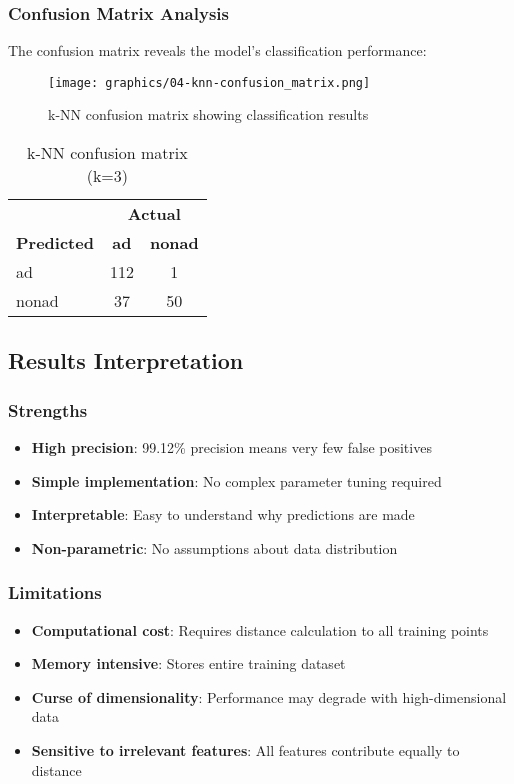 \subsubsection{Confusion Matrix Analysis}
The confusion matrix reveals the model's classification performance:

\begin{figure}[H]
\centering
\texttt{[image: graphics/04-knn-confusion\_matrix.png]}
\caption{k-NN confusion matrix showing classification results}
\label{fig:knn-confusion-matrix}
\end{figure}

\begin{table}[H]
\centering
\caption{k-NN confusion matrix (k=3)}
\label{tab:knn-confusion}
\begin{tabular}{lcc}
\toprule
 & \multicolumn{2}{c}{\textbf{Actual}} \\
\textbf{Predicted} & \textbf{ad} & \textbf{nonad} \\
\midrule
ad & 112 & 1 \\
nonad & 37 & 50 \\
\bottomrule
\end{tabular}
\end{table}

\subsection{Results Interpretation}
\subsubsection{Strengths}
\begin{itemize}
    \item \textbf{High precision}: 99.12\% precision means very few false positives
    \item \textbf{Simple implementation}: No complex parameter tuning required
    \item \textbf{Interpretable}: Easy to understand why predictions are made
    \item \textbf{Non-parametric}: No assumptions about data distribution
\end{itemize}

\subsubsection{Limitations}
\begin{itemize}
    \item \textbf{Computational cost}: Requires distance calculation to all training points
    \item \textbf{Memory intensive}: Stores entire training dataset
    \item \textbf{Curse of dimensionality}: Performance may degrade with high-dimensional data
    \item \textbf{Sensitive to irrelevant features}: All features contribute equally to distance
\end{itemize}

